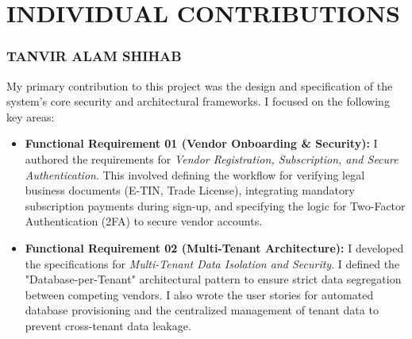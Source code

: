 \chapter{INDIVIDUAL CONTRIBUTIONS} \label{ch:data}
\subsection*{TANVIR ALAM SHIHAB}

My primary contribution to this project was the design and specification of the system's core security and architectural frameworks. I focused on the following key areas:

\begin{itemize}
    \item \textbf{Functional Requirement 01 (Vendor Onboarding \& Security):} 
    I authored the requirements for \textit{Vendor Registration, Subscription, and Secure Authentication}. This involved defining the workflow for verifying legal business documents (E-TIN, Trade License), integrating mandatory subscription payments during sign-up, and specifying the logic for Two-Factor Authentication (2FA) to secure vendor accounts.

    \item \textbf{Functional Requirement 02 (Multi-Tenant Architecture):} 
    I developed the specifications for \textit{Multi-Tenant Data Isolation and Security}. I defined the "Database-per-Tenant" architectural pattern to ensure strict data segregation between competing vendors. I also wrote the user stories for automated database provisioning and the centralized management of tenant data to prevent cross-tenant data leakage.
\end{itemize}


